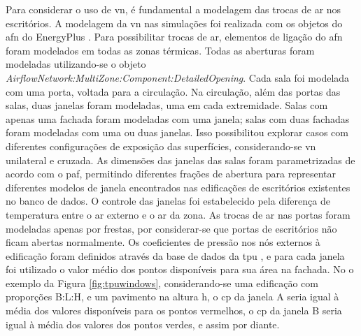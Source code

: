 \documentclass[brazil,hardcopy,openany]{ufscthesis} %
\begin{document}
Para considerar o uso de \acrfull{vn}, é fundamental a modelagem das trocas de ar nos escritórios. A modelagem da \acrshort{vn} nas simulações foi realizada com os objetos do \acrfull{afn} do EnergyPlus \cite{EnergyPlus2018}.
Para possibilitar trocas de ar, elementos de ligação do \acrshort{afn} foram modelados em todas as zonas térmicas.
Todas as aberturas foram modeladas utilizando-se o objeto \textit{AirflowNetwork:MultiZone:Component:DetailedOpening}.
Cada sala foi modelada com uma porta, voltada para a circulação.
Na circulação, além das portas das salas, duas janelas foram modeladas, uma em cada extremidade. 
Salas com apenas uma fachada foram modeladas com uma janela; salas com duas fachadas foram modeladas com uma ou duas janelas. Isso possibilitou explorar casos com diferentes configurações de exposição das superfícies, considerando-se \acrshort{vn} unilateral e cruzada.		
As dimensões das janelas das salas foram parametrizadas de acordo com o \acrfull{paf}, permitindo diferentes frações de abertura para representar diferentes modelos de janela encontrados nas edificações de escritórios existentes no banco de dados.
O controle das janelas foi estabelecido pela diferença de temperatura entre o ar externo e o ar da zona.
As trocas de ar nas portas foram modeladas apenas por frestas, por considerar-se que portas de escritórios não ficam abertas normalmente.  %
Os coeficientes de pressão nos nós externos à edificação foram definidos através da base de dados da \acrlong{tpu} \cite{TPU2018}, e para cada janela foi utilizado o valor médio dos pontos disponíveis para sua área na fachada. No o exemplo da Figura \ref{fig:tpuwindows}, considerando-se uma edificação com proporções B:L:H, e um pavimento na altura h, o \acrshort{cp} da janela A seria igual à média dos valores disponíveis para os pontos vermelhos, o \acrshort{cp} da janela B seria igual à média dos valores dos pontos verdes, e assim por diante.
\end{document}
